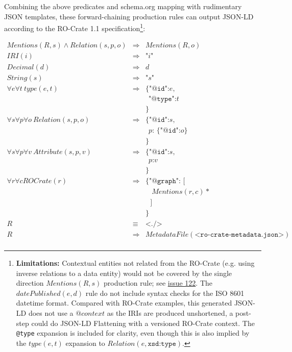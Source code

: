 Combining the above predicates and schema.org mapping with rudimentary JSON templates, these forward-chaining production rules can output JSON-LD according to the RO-Crate 1.1 specification\footnote{
    \textbf{Limitations:} Contextual entities not related from the RO-Crate (e.g. using inverse relations to a data entity) would not be covered by the single direction $Mentions(R, s)$ production rule; see \href{https://github.com/ResearchObject/ro-crate/issues/122}{issue 122}. The $datePublished(e, d)$ rule do not include syntax checks for the ISO 8601 datetime format. Compared with RO-Crate examples, this generated JSON-LD does not use a $@context$ as the IRIs are produced unshortened, a post-step could do JSON-LD Flattening with a versioned RO-Crate context. The \texttt{@type} expansion is included for clarity, even though this is also implied by the $type(e, t)$ expansion to $Relation(e, \texttt{xsd:type})$.
}:

\begin{eqnarray*}
Mentions(R, s) \land Relation(s,p,o)
                        & \Rightarrow & Mentions(R, o) \\
IRI(i)                  & \Rightarrow & \texttt{"} i \texttt{"} \\
Decimal(d)              & \Rightarrow & d \\
String(s)               & \Rightarrow & \texttt{"} s \texttt{"} \\
\forall e \forall t
\ type(e, t)            & \Rightarrow & \texttt{\{"@id":}  e \texttt{,} \\
&&                               \ \  \texttt{"@type":} t \\
&&                              \texttt{\}} \\
\forall s \forall p \forall o
\ Relation(s,p,o)
                        & \Rightarrow &  \texttt{\{"@id":}  s \texttt{,} \\
&&                               \ \  p \texttt{: \{ "@id":} o \texttt{\}} \\
&&                              \texttt{\}} \\
\forall s \forall p \forall v
\ Attribute(s,p,v)    & \Rightarrow &  \texttt{\{"@id":} s \texttt{,} \\
&&                               \ \ p \texttt{:} v  \\
&&                               \texttt{\}} \\
\forall r  \forall c
    ROCrate(r)      & \Rightarrow &  \texttt{\{ "@graph": [} \\
&& \ \ \ \ Mentions(r, c)* \\
&& \ \ \ \texttt{]} \\
&& \texttt{\}} \\
R   & \equiv & \texttt{<./>}  \\
R   & \Rightarrow &  MetadataFile(\texttt{<ro-crate-metadata.json>}) \\
\end{eqnarray*}

